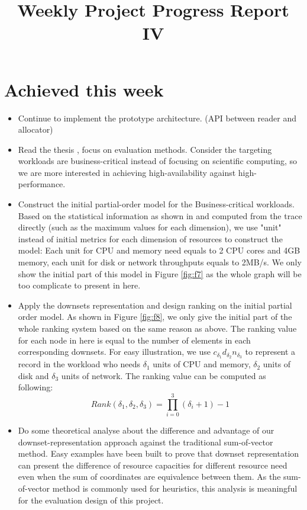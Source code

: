 \documentclass[10pt,conference,compsocconf]{IEEEtran}
\begin{document}
\title{Weekly Project Progress Report IV}

\author{}
\date{}
\maketitle

\section{Achieved this week}

\begin{itemize}
  \item Continue to implement the prototype architecture.  (API between reader and allocator) 
  \item Read the thesis \cite{van2015design}, focus on evaluation methods. Consider the targeting workloads are business-critical instead of focusing on scientific computing, so we are more interested in achieving high-availability against high-performance.
  \item Construct the initial partial-order model for the Business-critical workloads. Based on the statistical information as shown in  \cite{shen2015statistical} and computed from the trace directly (such as the maximum values for each dimension), we use "unit" instead of initial metrics for each dimension of resources to construct the model: Each unit for CPU and memory need equals to 2 CPU cores and 4GB memory, each unit for disk or network throughputs equals to 2MB/s.  
We only show the initial part of this model in Figure \ref{fig:f7} as the whole graph will be too complicate to present in here.  
    \item Apply the downsets representation and design ranking on the initial partial order model. As shown in Figure \ref{fig:f8}, we only give the initial part of the whole ranking system based on the same reason as above. The ranking value for each node in here is equal to the number of elements in each corresponding downsets. For easy illustration, we use $c_{\delta_{1}}d_{\delta_{2}}n_{\delta_{3}}$ to represent a record in the workload who needs $\delta_{1}$ units of CPU and memory, $\delta_{2}$ units of disk and $\delta_{3}$ units of network. The ranking value can be computed as following:
$$ Rank(\delta_{1},\delta_{2},\delta_{3})=\prod_{i=0}^{3}(\delta_{i}+1)-1 $$
  \item Do some theoretical analyse about the difference and advantage of our downset-representation approach against the traditional sum-of-vector method. Easy examples have been built to prove that downset representation can present the difference of resource capacities for different resource need even when the  sum of coordinates are equivalence between them.  As the sum-of-vector method is commonly used for heuristics, this analysis is meaningful for the evaluation design of this project.


\end{itemize}
\end{document}
